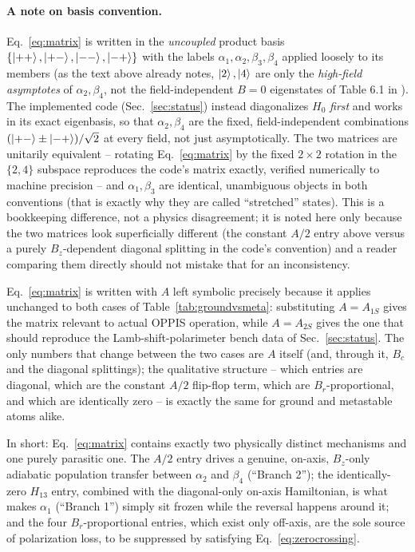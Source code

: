 \documentclass[11pt,a4paper]{article}
\begin{document}
\paragraph{A note on basis convention.} Eq.~\eqref{eq:matrix} is written in
the \emph{uncoupled} product basis $\{\ket{{+}{+}},\ket{{+}{-}},\ket{{-}{-}},\ket{{-}{+}}\}$
with the labels $\alpha_1,\alpha_2,\beta_3,\beta_4$ applied loosely to its
members (as the text above already notes, $\ket{2},\ket{4}$ are only the
\emph{high-field asymptotes} of $\alpha_2,\beta_4$, not the field-independent
$B{=}0$ eigenstates of Table 6.1 in \cite{kannis2023}). The implemented code
(Sec.~\ref{sec:status}) instead diagonalizes $H_0$ \emph{first} and works in
its exact eigenbasis, so that $\alpha_2,\beta_4$ are the fixed, field-independent
combinations $(\ket{{+}{-}}\pm\ket{{-}{+}})/\sqrt2$ at every field, not just
asymptotically. The two matrices are unitarily equivalent -- rotating
Eq.~\eqref{eq:matrix} by the fixed $2\times2$ rotation in the $\{2,4\}$
subspace reproduces the code's matrix exactly, verified numerically to
machine precision -- and $\alpha_1,\beta_3$ are identical, unambiguous
objects in both conventions (that is exactly why they are called
``stretched'' states). This is a bookkeeping difference, not a physics
disagreement; it is noted here only because the two matrices look
superficially different (the constant $A/2$ entry above versus a purely
$B_z$-dependent diagonal splitting in the code's convention) and a reader
comparing them directly should not mistake that for an inconsistency.

Eq.~\eqref{eq:matrix} is written with $A$ left symbolic precisely because it
applies unchanged to both cases of Table~\ref{tab:groundvsmeta}: substituting
$A=A_{1S}$ gives the matrix relevant to actual OPPIS operation, while
$A=A_{2S}$ gives the one that should reproduce the Lamb-shift-polarimeter
bench data of Sec.~\ref{sec:status}. The only numbers that change between
the two cases are $A$ itself (and, through it, $B_c$ and the diagonal
splittings); the qualitative structure -- which entries are diagonal, which
are the constant $A/2$ flip-flop term, which are $B_r$-proportional, and
which are identically zero -- is exactly the same for ground and metastable
atoms alike.

In short: Eq.~\eqref{eq:matrix} contains exactly two physically distinct
mechanisms and one purely parasitic one. The $A/2$ entry drives a genuine,
on-axis, $B_z$-only adiabatic population transfer between $\alpha_2$ and
$\beta_4$ (``Branch 2''); the identically-zero $H_{13}$ entry, combined with
the diagonal-only on-axis Hamiltonian, is what makes $\alpha_1$ (``Branch
1'') simply sit frozen while the reversal happens around it; and the four
$B_r$-proportional entries, which exist only off-axis, are the sole source
of polarization loss, to be suppressed by satisfying
Eq.~\eqref{eq:zerocrossing}.
\end{document}
